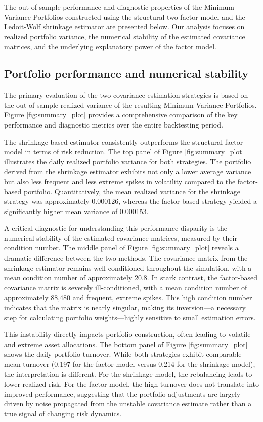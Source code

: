 \documentclass[]{article}
\begin{document}
The out-of-sample performance and diagnostic properties of the Minimum Variance Portfolios constructed using the structural two-factor model and the Ledoit-Wolf shrinkage estimator are presented below. Our analysis focuses on realized portfolio variance, the numerical stability of the estimated covariance matrices, and the underlying explanatory power of the factor model.

\subsection{Portfolio performance and numerical stability}
The primary evaluation of the two covariance estimation strategies is based on the out-of-sample realized variance of the resulting Minimum Variance Portfolios. Figure \ref{fig:summary_plot} provides a comprehensive comparison of the key performance and diagnostic metrics over the entire backtesting period.

The shrinkage-based estimator consistently outperforms the structural factor model in terms of risk reduction. The top panel of Figure \ref{fig:summary_plot} illustrates the daily realized portfolio variance for both strategies. The portfolio derived from the shrinkage estimator exhibits not only a lower average variance but also less frequent and less extreme spikes in volatility compared to the factor-based portfolio. Quantitatively, the mean realized variance for the shrinkage strategy was approximately 0.000126, whereas the factor-based strategy yielded a significantly higher mean variance of 0.000153.

A critical diagnostic for understanding this performance disparity is the numerical stability of the estimated covariance matrices, measured by their condition number. The middle panel of Figure \ref{fig:summary_plot} reveals a dramatic difference between the two methods. The covariance matrix from the shrinkage estimator remains well-conditioned throughout the simulation, with a mean condition number of approximately 20.8. In stark contrast, the factor-based covariance matrix is severely ill-conditioned, with a mean condition number of approximately 88,480 and frequent, extreme spikes. This high condition number indicates that the matrix is nearly singular, making its inversion—a necessary step for calculating portfolio weights—highly sensitive to small estimation errors.

This instability directly impacts portfolio construction, often leading to volatile and extreme asset allocations. The bottom panel of Figure \ref{fig:summary_plot} shows the daily portfolio turnover. While both strategies exhibit comparable mean turnover (0.197 for the factor model versus 0.214 for the shrinkage model), the interpretation is different. For the shrinkage model, the rebalancing leads to lower realized risk. For the factor model, the high turnover does not translate into improved performance, suggesting that the portfolio adjustments are largely driven by noise propagated from the unstable covariance estimate rather than a true signal of changing risk dynamics.
\end{document}
